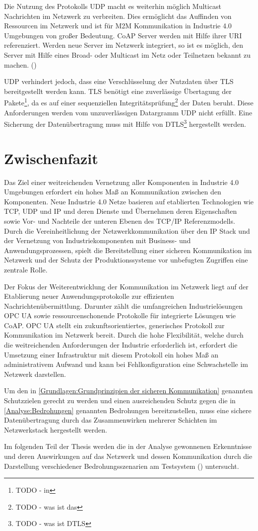\clearpage

Die Nutzung des Protokolls \ac{UDP} macht es weiterhin möglich Multicast Nachrichten im Netzwerk zu verbreiten. Dies ermöglicht das Auffinden von Ressourcen im Netzwerk und ist für \ac{M2M} Kommunikation in Industrie 4.0 Umgebungen von großer Bedeutung. \ac{CoAP} Server werden mit Hilfe ihrer \ac{URI} referenziert. Werden neue Server im Netzwerk integriert, so ist es möglich, den Server mit Hilfe eines Broad- oder Multicast im Netz oder Teilnetzen bekannt zu machen. (\cite{trapickin2013})

\ac{UDP} verhindert jedoch, dass eine Verschlüsselung der Nutzdaten über \ac{TLS} bereitgestellt werden kann. \ac{TLS} benötigt eine zuverlässige Übertagung der Pakete\footnote{TODO - in }, da es auf einer sequenziellen Integritätsprüfung\footnote{TODO - was ist das} der Daten beruht. Diese Anforderungen werden vom unzuverlässigen Datargramm \ac{UDP} nicht erfüllt. Eine Sicherung der Datenübertragung muss mit Hilfe von \ac{DTLS}\footnote{TODO - was ist DTLS} hergestellt werden.

\section{Zwischenfazit}
Das Ziel einer weitreichenden Vernetzung aller Komponenten in Industrie 4.0 Umgebungen erfordert ein hohes Maß an Kommunikation zwischen den Komponenten. Neue Industrie 4.0 Netze basieren auf etablierten Technologien wie \ac{TCP}, \ac{UDP} und \ac{IP} und deren Dienste und Übernehmen deren Eigenschaften sowie Vor- und Nachteile der unteren Ebenen des \ac{TCP}/\ac{IP} Referenzmodells. Durch die Vereinheitlichung der Netzwerkkommunikation über den \ac{IP} Stack und der Vernetzung von Industriekomponenten mit Business- und Anwendungsprozessen, spielt die Bereitstellung einer sicheren Kommunikation im Netzwerk und der Schutz der Produktionssysteme vor unbefugten Zugriffen eine zentrale Rolle.

Der Fokus der Weiterentwicklung der Kommunikation im Netzwerk liegt auf der Etablierung neuer Anwendungsprotokolle zur effizienten Nachrichtenübermittlung. Darunter zählt die umfangreichen Industrielösungen \ac{OPC UA} sowie ressourcenschonende Protokolle für integrierte Lösungen wie \ac{CoAP}. \ac{OPC UA} stellt ein zukunftsorientiertes, generisches Protokoll zur Kommunikation im Netzwerk bereit. Durch die hohe Flexibilität, welche durch die weitreichenden Anforderungen der Industrie erforderlich ist, erfordert die Umsetzung einer Infrastruktur mit diesem Protokoll ein hohes Maß an administrativem Aufwand und kann bei Fehlkonfiguration eine Schwachstelle im Netzwerk darstellen. 

Um den in \autoref{Grundlagen:Grundprinzipien der sicheren Kommunikation} genannten Schutzzielen gerecht zu werden und einen ausreichenden Schutz gegen die in \autoref{Analyse:Bedrohungen} genannten Bedrohungen bereitzustellen, muss eine sichere Datenübertragung durch das Zusammenwirken mehrerer Schichten im Netzwerkstack hergestellt werden.

Im folgenden Teil der Thesis werden die in der Analyse gewonnenen Erkenntnisse und deren Auswirkungen auf das Netzwerk und dessen Kommunikation durch die Darstellung verschiedener Bedrohungsszenarien am Testsystem (\cite{Weber2018}) untersucht.